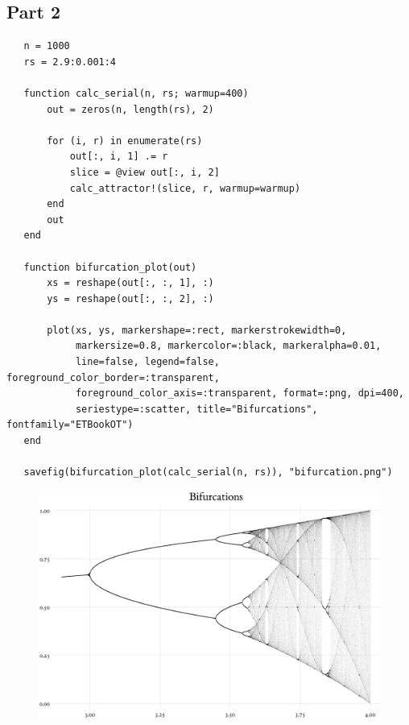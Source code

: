 \documentclass[nobib]{tufte-handout}
\begin{document}
\subsection{Part 2}
\label{sec:org51f9e11}
\begin{verbatim}
   n = 1000
   rs = 2.9:0.001:4

   function calc_serial(n, rs; warmup=400)
       out = zeros(n, length(rs), 2)

       for (i, r) in enumerate(rs)
           out[:, i, 1] .= r
           slice = @view out[:, i, 2]
           calc_attractor!(slice, r, warmup=warmup)
       end
       out
   end

   function bifurcation_plot(out)
       xs = reshape(out[:, :, 1], :)
       ys = reshape(out[:, :, 2], :)

       plot(xs, ys, markershape=:rect, markerstrokewidth=0,
            markersize=0.8, markercolor=:black, markeralpha=0.01,
            line=false, legend=false, foreground_color_border=:transparent,
            foreground_color_axis=:transparent, format=:png, dpi=400,
            seriestype=:scatter, title="Bifurcations", fontfamily="ETBookOT")
   end

   savefig(bifurcation_plot(calc_serial(n, rs)), "bifurcation.png")
\end{verbatim}

\begin{figure}
\centering
\includegraphics[width=.9\linewidth]{./bifurcation.png}
\end{figure}
\end{document}
